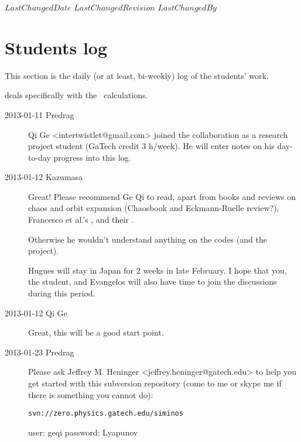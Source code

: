 \ifsvnmulti
 {$LastChangedDate$}
 {$LastChangedRevision$} {$LastChangedBy$}
\fi

\chapter{Students log}
\label{c-students}

This section is the daily (or at least, bi-weekly)  log of the students'
work.

 deals specifically with the \KS\ calculations.


\begin{description}

\item[2013-01-11 Predrag] Qi Ge  <intertwistlet@gmail.com> joined the
collaboration as a research project student (GaTech credit 3 h/week).
He will enter notes on his day-to-day progress into this log.

\item[2013-01-12 Kazumasa]
Great! Please recommend Ge Qi to read, apart from books and reviews on
chaos and orbit expansion (Chaosbook and Eckmann-Ruelle review?),
Francesco et al.'s
, and their
.

Otherwise he wouldn't understand anything on the codes (and the project).

Hugues will stay in Japan for 2 weeks in late February. I hope that you,
the student, and Evangelos will also have time to join the discussions
during this period.

\item[2013-01-12 Qi Ge]
Great, this will be a good start point.

\item[2013-01-23 Predrag] Please ask Jeffrey M. Heninger
<jeffrey.heninger@gatech.edu> to help you get started with this
subversion repository (come to me or skype me if there is something you
cannot do):

\texttt{svn://zero.physics.gatech.edu/siminos}

user: geqi  password: Lyapunov


\end{description}

\renewcommand{\ssp}{a}
